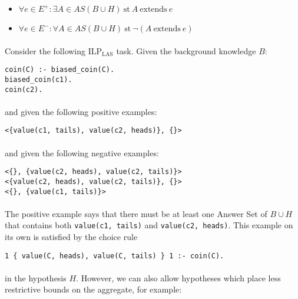 \documentclass{article}
\theoremstyle{plain}
\theoremstyle{definition}
\begin{document}
\begin{multicols}{2}
\begin{itemize}
\item $\forall e \in E^+: \exists A \in AS(B \cup H)\ \text{st}\ A\ \text{extends}\ e$
\item $\forall e \in E^-: \forall A \in AS(B \cup H)\ \text{st}\ \lnot(A\ \text{extends}\ e)$
\end{itemize}

\paragraph{} Consider the following $\text{ILP}_\text{LAS}$ task. Given the background knowledge $B$:

\begin{lstlisting}
coin(C) :- biased_coin(C).
biased_coin(c1).
coin(c2).
\end{lstlisting}

\paragraph{} and given the following positive examples:

\begin{lstlisting}
<{value(c1, tails), value(c2, heads)}, {}>
\end{lstlisting}

\paragraph{} and given the following negative examples:

\begin{lstlisting}
<{}, {value(c2, heads), value(c2, tails)}>
<{value(c2, heads), value(c2, tails)}, {}>
<{}, {value(c1, tails)}>
\end{lstlisting}

\paragraph{} The positive example says that there must be at least one Answer Set of $B \cup H$ that contains both \lstinline{value(c1, tails)} and \lstinline{value(c2, heads)}. This example on its own is satisfied by the choice rule 

\begin{lstlisting}
1 { value(C, heads), value(C, tails) } 1 :- coin(C).
\end{lstlisting}

\paragraph{} in the hypothesis $H$. However, we can also allow hypotheses which place less restrictive bounds on the aggregate, for example:


\end{multicols}
\end{document}
